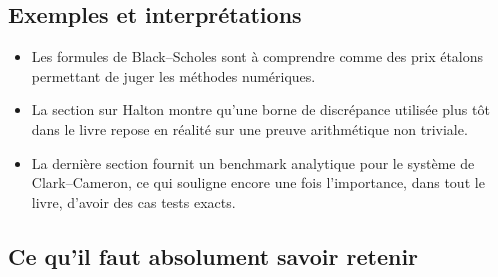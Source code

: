 \documentclass[11pt,a4paper]{article}
\begin{document}
\subsection{Exemples et interprétations}

\begin{itemize}
  \item Les formules de Black--Scholes sont à comprendre comme des prix étalons permettant de juger les méthodes numériques.
  \item La section sur Halton montre qu'une borne de discrépance utilisée plus tôt dans le livre repose en réalité sur une preuve arithmétique non triviale.
  \item La dernière section fournit un benchmark analytique pour le système de Clark--Cameron, ce qui souligne encore une fois l'importance, dans tout le livre, d'avoir des cas tests exacts.
\end{itemize}

\subsection{Ce qu'il faut absolument savoir retenir}
\end{document}
